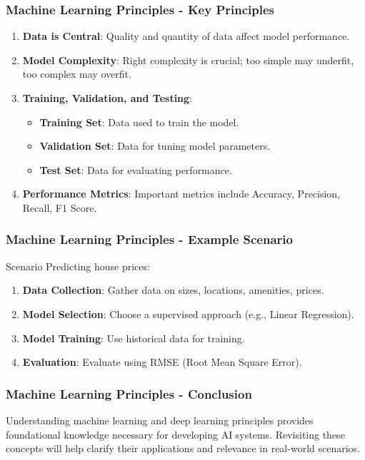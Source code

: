 \documentclass[aspectratio=169]{beamer}
\begin{document}
\begin{frame}[fragile]
    \frametitle{Machine Learning Principles - Key Principles}
    \begin{enumerate}
        \item \textbf{Data is Central}: Quality and quantity of data affect model performance.
        \item \textbf{Model Complexity}: Right complexity is crucial; too simple may underfit, too complex may overfit.
        \item \textbf{Training, Validation, and Testing}:
            \begin{itemize}
                \item \textbf{Training Set}: Data used to train the model.
                \item \textbf{Validation Set}: Data for tuning model parameters.
                \item \textbf{Test Set}: Data for evaluating performance.
            \end{itemize}
        \item \textbf{Performance Metrics}: Important metrics include Accuracy, Precision, Recall, F1 Score.
    \end{enumerate}
\end{frame}

\begin{frame}[fragile]
    \frametitle{Machine Learning Principles - Example Scenario}
    \begin{block}{Scenario}
        Predicting house prices:
    \end{block}
    \begin{enumerate}
        \item \textbf{Data Collection}: Gather data on sizes, locations, amenities, prices.
        \item \textbf{Model Selection}: Choose a supervised approach (e.g., Linear Regression).
        \item \textbf{Model Training}: Use historical data for training.
        \item \textbf{Evaluation}: Evaluate using RMSE (Root Mean Square Error).
    \end{enumerate}
\end{frame}

\begin{frame}[fragile]
    \frametitle{Machine Learning Principles - Conclusion}
    Understanding machine learning and deep learning principles provides foundational knowledge necessary for developing AI systems. Revisiting these concepts will help clarify their applications and relevance in real-world scenarios.
\end{frame}
\end{document}
